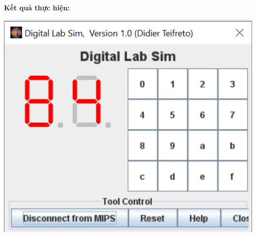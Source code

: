 \documentclass[12pt,a4paper,oneside]{article}
\begin{document}
\textbf{Kết quả thực hiện:}
\begin{center}
\includegraphics[scale=1]{3}
\end{center}
\pagebreak
\end{document}
